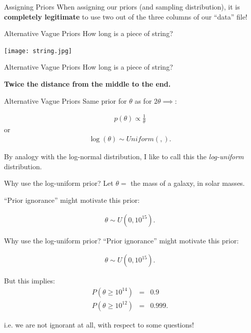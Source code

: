 \begin{frame}[t]{Assigning Priors}
When assigning our priors (and sampling distribution), it is {\bf completely
legitimate} to use two out of the three columns of our ``data'' file!
\end{frame}

\begin{frame}[t]{Alternative Vague Priors}
How long is a piece of string?
\begin{center}
\texttt{[image: string.jpg]}
\end{center}
\end{frame}

\begin{frame}[t]{Alternative Vague Priors}
How long is a piece of string?

{\bf Twice the distance from the middle to the end.}
\end{frame}

\begin{frame}[t]{Alternative Vague Priors}
Same prior for $\theta$ as for $2\theta \implies$:

\begin{eqnarray*}
p(\theta) \propto \frac{1}{\theta}
\end{eqnarray*}
or
\begin{eqnarray*}
\log(\theta) \sim Uniform(,).
\end{eqnarray*}

By analogy with the log-normal distribution, I like to call this the
{\it log-uniform} distribution.
\end{frame}

\begin{frame}[t]{Why use the log-uniform prior?}
Let $\theta =$ the mass of a galaxy, in solar masses.

``Prior ignorance'' might motivate this prior:

\begin{eqnarray*}
\theta \sim U(0, 10^{15}).
\end{eqnarray*}

\end{frame}

\begin{frame}[t]{Why use the log-uniform prior?}
``Prior ignorance'' might motivate this prior:

\begin{eqnarray*}
\theta \sim U(0, 10^{15}).
\end{eqnarray*}

But this implies:
\begin{eqnarray*}
P(\theta \geq 10^{14}) &=& 0.9\\
P(\theta \geq 10^{12}) &=& 0.999.
\end{eqnarray*}

i.e. we are not ignorant at all, with respect to some questions!

\end{frame}

